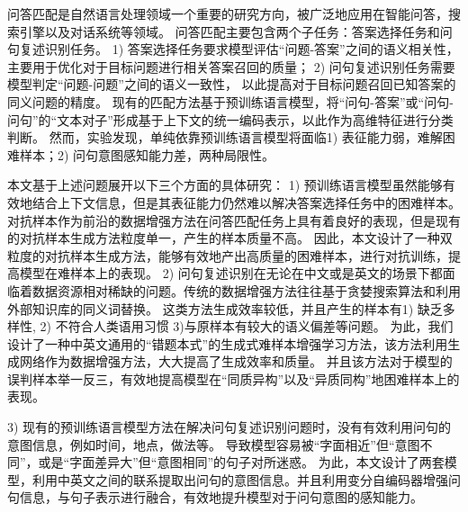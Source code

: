 
\begin{cabstract}

	问答匹配是自然语言处理领域一个重要的研究方向，被广泛地应用在智能问答，搜索引擎以及对话系统等领域。
	问答匹配主要包含两个子任务：答案选择任务和问句复述识别任务。
	1) 答案选择任务要求模型评估“问题-答案”之间的语义相关性，
	主要用于优化对于目标问题进行相关答案召回的质量；
	2) 问句复述识别任务需要模型判定“问题-问题”之间的语义一致性，
	以此提高对于目标问题召回已知答案的同义问题的精度。
	现有的匹配方法基于预训练语言模型，将“问句-答案”或“问句-问句”的“文本对子”形成基于上下文的统一编码表示，以此作为高维特征进行分类判断。
	然而，实验发现，单纯依靠预训练语言模型将面临1) 表征能力弱，难解困难样本；2) 问句意图感知能力差，两种局限性。


	本文基于上述问题展开以下三个方面的具体研究：
	1) 预训练语言模型虽然能够有效地结合上下文信息，但是其表征能力仍然难以解决答案选择任务中的困难样本。
	对抗样本作为前沿的数据增强方法在问答匹配任务上具有着良好的表现，但是现有的对抗样本生成方法粒度单一，产生的样本质量不高。
	因此，本文设计了一种双粒度的对抗样本生成方法，能够有效地产出高质量的困难样本，进行对抗训练，提高模型在难样本上的表现。
	2) 问句复述识别在无论在中文或是英文的场景下都面临着数据资源相对稀缺的问题。传统的数据增强方法往往基于贪婪搜索算法和利用外部知识库的同义词替换。
	这类方法生成效率较低，并且产生的样本有1) 缺乏多样性, 2) 不符合人类语用习惯 3)与原样本有较大的语义偏差等问题。
	为此，我们设计了一种中英文通用的“错题本式”的生成式难样本增强学习方法，该方法利用生成网络作为数据增强方法，大大提高了生成效率和质量。
	并且该方法对于模型的误判样本举一反三，有效地提高模型在“同质异构”以及“异质同构”地困难样本上的表现。

	3) 现有的预训练语言模型方法在解决问句复述识别问题时，没有有效利用问句的意图信息，例如时间，地点，做法等。
	导致模型容易被“字面相近”但“意图不同”，或是“字面差异大”但“意图相同”的句子对所迷惑。
	为此，本文设计了两套模型，利用中英文之间的联系提取出问句的意图信息。并且利用变分自编码器增强问句信息，与句子表示进行融合，有效地提升模型对于问句意图的感知能力。


\end{cabstract}
